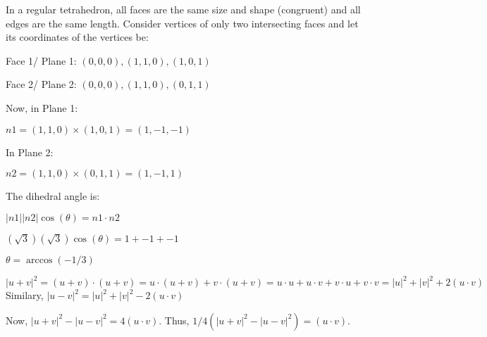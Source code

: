 \documentclass[titlepage,12pt]{book}
\begin{document}
\mainmatter

\begin{solution}
    In a regular tetrahedron, all faces are the same size and shape (congruent) and all edges are the same length.
    Consider vertices of only two intersecting faces and let its coordinates of the vertices be:

    Face 1/ Plane 1: $(0,0,0), (1, 1, 0), (1, 0, 1)$

    Face 2/ Plane 2: $(0,0,0), (1, 1, 0), (0, 1, 1)$
    

    Now, in Plane 1:
    
    $n1 = (1, 1, 0) \times (1, 0, 1) = (1, -1, -1)$


    In Plane 2:

    $n2 = (1, 1, 0) \times (0, 1, 1) = (1, -1, 1)$

    The dihedral angle is:

    $|n1||n2| \cos(\theta) = n1 \cdot n2$
    
    $(\sqrt{3}) (\sqrt{3}) \cos(\theta) =  1 + -1 + -1$

    $\theta = \arccos(-1/3)$
\end{solution}


\begin{solution}
    $|u + v|^{2} = (u + v) \cdot (u + v) = u \cdot (u + v) + v \cdot (u + v) = u \cdot u + u \cdot v + v \cdot u + v \cdot v = |u|^{2} + |v|^{2} + 2 (u \cdot v)$
    Similary, $|u - v|^{2} = |u|^{2} + |v|^{2} - 2 (u \cdot v)$

    Now, $|u + v|^{2} - |u - v|^{2} = 4 (u \cdot v)$.
    Thus, $1/4 (|u + v|^{2} - |u - v|^{2}) = (u \cdot v)$.
\end{solution}
\end{document}
